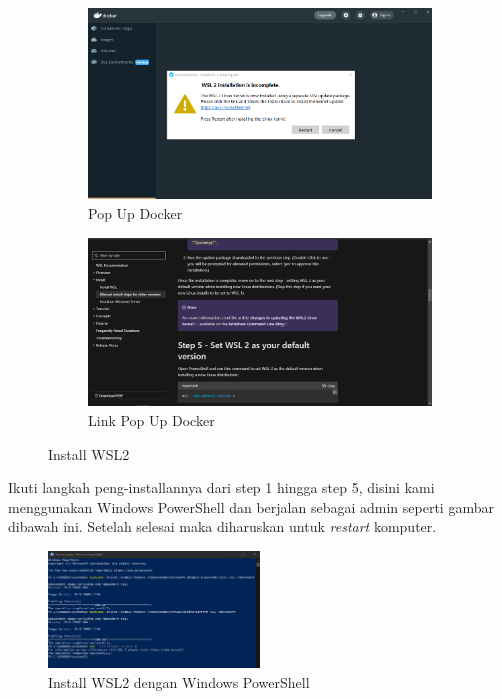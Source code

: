 \documentclass[11pt,a4paper]{article}
\begin{document}
\begin{figure}[h]
	\centering
	\begin{subfigure}[b]{0.4\textwidth}
		\centering
		\def\svgwidth{\columnwidth}
		\includegraphics[width=1\textwidth]{Figure/2. pop up.png}
		\caption{Pop Up Docker}
	\end{subfigure}
	\qquad
	\begin{subfigure}[b]{0.45\textwidth}
		\centering
		\def\svgwidth{\columnwidth}
		\includegraphics[width=1\textwidth]{Figure/3. wsl.png}
		\caption{Link Pop Up Docker}
	\end{subfigure}
	\caption{Install WSL2}
\end{figure}
\newline
Ikuti langkah peng-installannya dari step 1 hingga step 5, disini kami menggunakan Windows PowerShell dan berjalan sebagai admin seperti gambar dibawah ini. Setelah selesai maka diharuskan untuk \textit{restart} komputer.
 \begin{figure}[h]
     \centering
     \includegraphics[width=0.5\textwidth]{Figure/4. wsl.png}
     \caption{Install WSL2 dengan Windows PowerShell}
 \end{figure}
\end{document}
